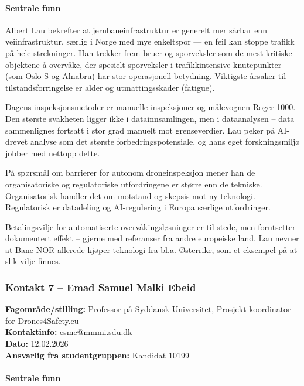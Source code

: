 \paragraph{Sentrale funn} 

Albert Lau bekrefter at jernbaneinfrastruktur er generelt mer sårbar enn veiinfrastruktur, særlig i Norge med mye enkeltspor --- en feil kan stoppe trafikk på hele strekninger. Han trekker frem bruer og sporveksler som de mest kritiske objektene å overvåke, der spesielt sporveksler i trafikkintensive knutepunkter (som Oslo S og Alnabru) har stor operasjonell betydning. Viktigste årsaker til tilstandsforringelse er alder og utmattingsskader (fatigue).

Dagens inspeksjonsmetoder er manuelle inspeksjoner og målevognen Roger 1000. Den største svakheten ligger ikke i datainnsamlingen, men i dataanalysen – data sammenlignes fortsatt i stor grad manuelt mot grenseverdier. Lau peker på AI-drevet analyse som det største forbedringspotensiale, og hans eget forskningsmiljø jobber med nettopp dette.

På spørsmål om barrierer for autonom droneinspeksjon mener han de organisatoriske og regulatoriske utfordringene er større enn de tekniske. Organisatorisk handler det om motstand og skepsis mot ny teknologi. Regulatorisk er datadeling og AI-regulering i Europa særlige utfordringer.

Betalingsvilje for automatiserte overvåkingsløsninger er til stede, men forutsetter dokumentert effekt – gjerne med referanser fra andre europeiske land. Lau nevner at Bane NOR allerede kjøper teknologi fra bl.a. Østerrike, som et eksempel på at slik vilje finnes.

\subsubsection{Kontakt 7  – Emad Samuel Malki Ebeid}
\label{kontakt:ebeid}

\textbf{Fagområde/stilling:} Professor på Syddansk Universitet, Prosjekt koordinator for Drones4Safety.eu \\
\textbf{Kontaktinfo:} esme@mmmi.sdu.dk \\
\textbf{Dato:} 12.02.2026 \\
\textbf{Ansvarlig fra studentgruppen:} Kandidat 10199

\paragraph{Sentrale funn} 

